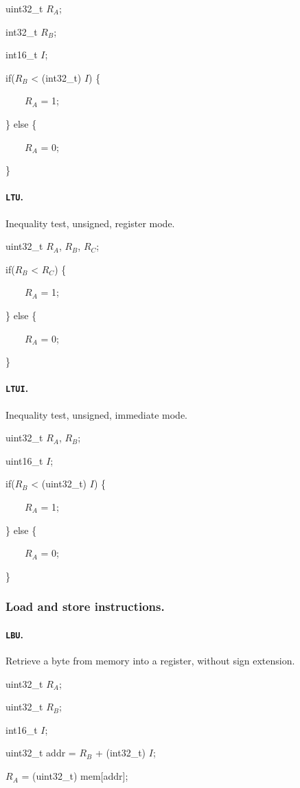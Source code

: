 \documentclass[12pt,english,twoside]{report}
\def\code{\texttt}
\def\subsubsubsection{\paragraph}
\newenvironment{codeblock}
{\begin{list}{}{
\setlength{\rightmargin}{\leftmargin}
\setlength{\listparindent}{0pt}%
\raggedright
\setlength{\itemsep}{0pt}
\setlength{\parsep}{0pt}
\normalfont\ttfamily}%
 \item[]}
{\end{list}}
\begin{document}
\begin{codeblock}
  uint32\_t $R_A$;

  int32\_t $R_B$;

  int16\_t $I$;

  if($R_B$ < (int32\_t) $I$) \{

{}~~~~$R_A$ = 1;

  \} else \{

{}~~~~$R_A$ = 0;

  \}
\end{codeblock}

\subsubsubsection{\label{sec:Ins_LTU}\code{LTU}.}
Inequality test, unsigned, register mode.

\begin{codeblock}
  uint32\_t $R_A$, $R_B$, $R_C$;

  if($R_B$ < $R_C$) \{

{}~~~~$R_A$ = 1;

  \} else \{

{}~~~~$R_A$ = 0;

  \}
\end{codeblock}

\subsubsubsection{\label{sec:Ins_LTUI}\code{LTUI}.}
Inequality test, unsigned, immediate mode.

\begin{codeblock}
  uint32\_t $R_A$, $R_B$;

  uint16\_t $I$;

  if($R_B$ < (uint32\_t) $I$) \{

{}~~~~$R_A$ = 1;

  \} else \{

{}~~~~$R_A$ = 0;

  \}
\end{codeblock}


\subsubsection{Load and store instructions.}

\subsubsubsection{\label{sec:Ins_LBU}\code{LBU}.}
Retrieve a byte from memory into a register, without sign extension.

\begin{codeblock}
  uint32\_t $R_A$;
  
  uint32\_t $R_B$;

  int16\_t $I$;

  uint32\_t addr = $R_B$ + (int32\_t) $I$;

  $R_A$ = (uint32\_t) mem[addr];
\end{codeblock}
\end{document}
